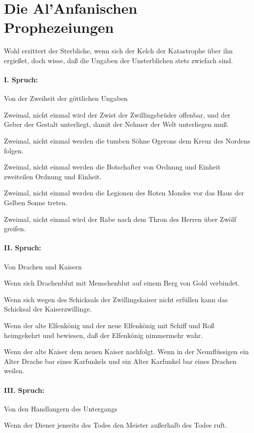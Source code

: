 \section{Die Al'Anfanischen Prophezeiungen}

Wohl erzittert der Sterbliche, wenn sich der Kelch der Katastrophe über ihn ergießet, doch wisse, daß die Ungaben der Unsterblichen stets zwiefach sind.

\paragraph{I. Spruch:} Von der Zweiheit der göttlichen Ungaben

Zweimal, nicht einmal wird der Zwist der Zwillingsbrüder offenbar, und der Geber der Gestalt unterliegt, damit der Nehmer der Welt unterliegen muß.

Zweimal, nicht einmal werden die tumben Söhne Ogerons dem Kreuz des Nordens folgen.

Zweimal, nicht einmal werden die Botschafter von Ordnung und Einheit zweiteilen Ordnung und Einheit.

Zweimal, nicht einmal werden die Legionen des Roten Mondes vor das Haus der Gelben Sonne treten.

Zweimal, nicht einmal wird der Rabe nach dem Thron des Herren über Zwölf greifen. 

\paragraph{II. Spruch:} Von Drachen und Kaisern

Wenn sich Drachenblut mit Menschenblut auf einem Berg von Gold verbindet.

Wenn sich wegen des Schicksals der Zwillingskaiser nicht erfüllen kann das Schicksal der Kaiserzwillinge.

Wenn der alte Elfenkönig und der neue Elfenkönig mit Schiff und Roß heimgekehrt und bewiesen, daß der Elfenkönig nimmermehr wahr.

Wenn der alte Kaiser dem neuen Kaiser nachfolgt.
Wenn in der Neunflüssigen ein Alter Drache bar eines Karfunkels und ein Alter Karfunkel bar eines Drachen weilen. 

\paragraph{III. Spruch:} Von den Handlangern des Untergangs

Wenn der Diener jenseits des Todes den Meister außerhalb des Todes ruft.

